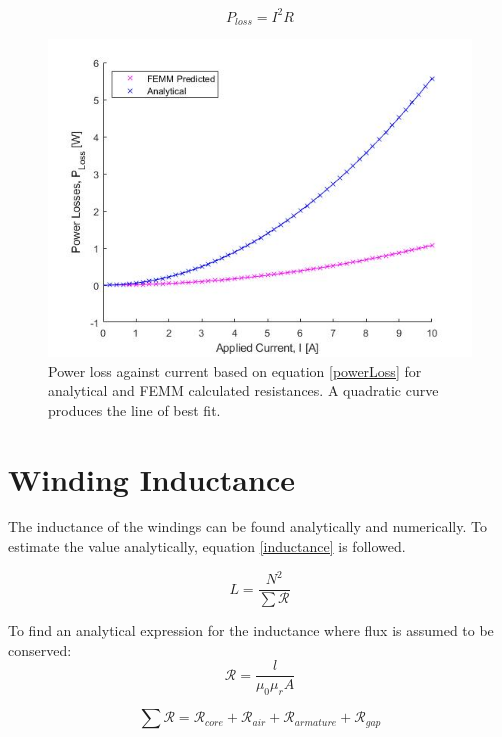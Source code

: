 \documentclass[a4paper]{IEEEtran}
\begin{document}
    \begin{equation}
        P_{loss} = I^2 R
        \label{powerLoss}
    \end{equation}
    
    \begin{figure}[ht]
        \includegraphics[width = \linewidth]{ResistanceWindingLoss.jpg}
        \caption{Power loss against current based on equation \ref{powerLoss} for analytical and FEMM calculated resistances. A quadratic curve produces the line of best fit.}
        \label{windingLoss} 
    \end{figure}

\section{Winding Inductance}
    The inductance of the windings can be found analytically and numerically. To estimate the value analytically, equation \ref{inductance} is followed. 

    \begin{equation}
        L = \frac{N^2}{\sum{\mathcal{R}}}
        \label{inductance}
    \end{equation}

    To find an analytical expression for the inductance where flux is assumed to be conserved:
    \begin{equation}
        \mathcal{R} =  \frac{l}{\mu_{0}\mu_{r}A}
        \label{reluctance}
    \end{equation}


    \begin{equation}
        \sum{\mathcal{R}} = \mathcal{R}_{core} + \mathcal{R}_{air} + \mathcal{R}_{armature} + \mathcal{R}_{gap}
        \label{summm}
    \end{equation}
\end{document}
